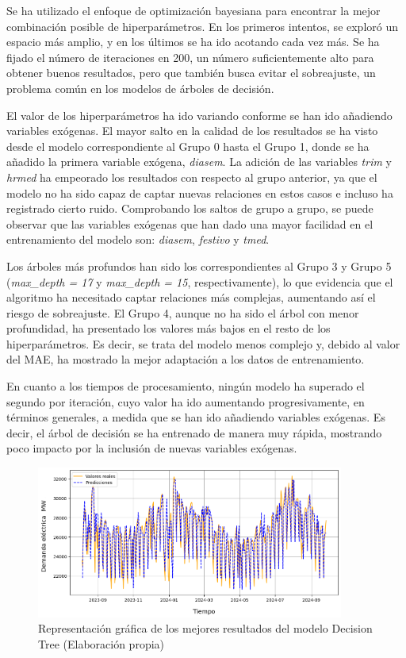 \documentclass[12pt,a4paper]{report}
\begin{document}
Se ha utilizado el enfoque de optimización bayesiana para encontrar la mejor combinación posible de hiperparámetros. En los primeros intentos, se exploró un espacio más amplio, y en los últimos se ha ido acotando cada vez más. Se ha fijado el número de iteraciones en 200, un número suficientemente alto para obtener buenos resultados, pero que también busca evitar el sobreajuste, un problema común en los modelos de árboles de decisión.

El valor de los hiperparámetros ha ido variando conforme se han ido añadiendo variables exógenas. El mayor salto en la calidad de los resultados se ha visto desde el modelo correspondiente al Grupo 0 hasta el Grupo 1, donde se ha añadido la primera variable exógena, \textit{diasem}. La adición de las variables \textit{trim} y \textit{hrmed} ha empeorado los resultados con respecto al grupo anterior, ya que el modelo no ha sido capaz de captar nuevas relaciones en estos casos e incluso ha registrado cierto ruido. Comprobando los saltos de grupo a grupo, se puede observar que las variables exógenas que han dado una mayor facilidad en el entrenamiento del modelo son: \textit{diasem}, \textit{festivo} y \textit{tmed}.

Los árboles más profundos han sido los correspondientes al Grupo 3 y Grupo 5 (\textit{max\_depth = 17} y \textit{max\_depth = 15}, respectivamente), lo que evidencia que el algoritmo ha necesitado captar relaciones más complejas, aumentando así el riesgo de sobreajuste. El Grupo 4, aunque no ha sido el árbol con menor profundidad, ha presentado los valores más bajos en el resto de los hiperparámetros. Es decir, se trata del modelo menos complejo y, debido al valor del MAE, ha mostrado la mejor adaptación a los datos de entrenamiento.

En cuanto a los tiempos de procesamiento, ningún modelo ha superado el segundo por iteración, cuyo valor ha ido aumentando progresivamente, en términos generales, a medida que se han ido añadiendo variables exógenas. Es decir, el árbol de decisión se ha entrenado de manera muy rápida, mostrando poco impacto por la inclusión de nuevas variables exógenas.

\begin{figure}[H]
    \centering
    \includegraphics[width=0.9\textwidth]{Images/tfm-4.2(decisiontree).png}
    \caption{Representación gráfica de los mejores resultados del modelo Decision Tree (Elaboración propia) }
    \label{fig:figura_DT}
\end{figure}
\end{document}
